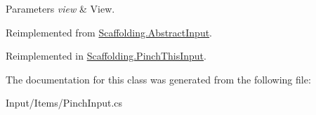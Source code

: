 \begin{DoxyParams}{Parameters}
{\em view} & View.\\
\hline
\end{DoxyParams}


Reimplemented from \hyperlink{class_scaffolding_1_1_abstract_input_a598859c6342920d2b0c985310e6e9476}{Scaffolding.\-Abstract\-Input}.



Reimplemented in \hyperlink{class_scaffolding_1_1_pinch_this_input_a60b5bc5461de1286d8bd142742451dab}{Scaffolding.\-Pinch\-This\-Input}.



The documentation for this class was generated from the following file\-:\begin{DoxyCompactItemize}
\item 
Input/\-Items/Pinch\-Input.\-cs\end{DoxyCompactItemize}
